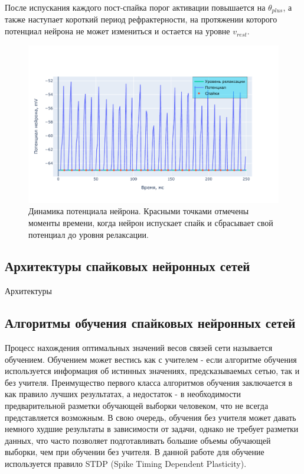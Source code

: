 \documentclass[a4paper]{article}
\begin{document}
После испускания каждого пост-спайка порог активации повышается на $\theta_{plus}$, а также наступает короткий период рефрактерности, на протяжении которого потенциал нейрона не может измениться и остается на уровне $v_{rest}$.

\begin{center}
\begin{figure}[H] 
 \includegraphics[width=\textwidth,keepaspectratio=true]{voltage_ru.pdf}
 \caption{Динамика потенциала нейрона. Красными точками отмечены моменты времени, когда нейрон испускает спайк и сбрасывает свой потенциал до уровня релаксации.}
\end{figure}
\end{center}

\subsection{Архитектуры спайковых нейронных сетей}
Архитектуры

\subsection{Алгоритмы обучения спайковых нейронных сетей}
Процесс нахождения оптимальных значений весов связей сети называется обучением. Обучением может вестись как с учителем - если алгоритме обучения используется информация об истинных значениях, предсказываемых сетью, так и без учителя. Преимущество первого класса алгоритмов обучения заключается в как правило лучших результатах, а недостаток - в необходимости предварительной разметки обучающей выборки человеком, что не всегда представляется возможным. В свою очередь, обучения без учителя может давать немного худшие результаты в зависимости от задачи, однако не требует разметки данных, что часто позволяет подготавливать большие объемы обучающей выборки, чем при обучении без учителя. В данной работе для обучение используется правило STDP (Spike Timing Dependent Plasticity).
\end{document}

